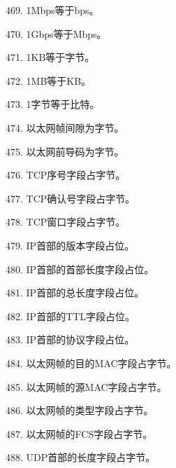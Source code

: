 469. 1Mbps等于\underline{\hspace{2cm}}bps。

470. 1Gbps等于\underline{\hspace{2cm}}Mbps。

471. 1KB等于\underline{\hspace{2cm}}字节。

472. 1MB等于\underline{\hspace{2cm}}KB。

473. 1字节等于\underline{\hspace{2cm}}比特。

474. 以太网帧间隙为\underline{\hspace{2cm}}字节。

475. 以太网前导码为\underline{\hspace{2cm}}字节。

476. TCP序号字段占\underline{\hspace{2cm}}字节。

477. TCP确认号字段占\underline{\hspace{2cm}}字节。

478. TCP窗口字段占\underline{\hspace{2cm}}字节。

479. IP首部的版本字段占\underline{\hspace{2cm}}位。

480. IP首部的首部长度字段占\underline{\hspace{2cm}}位。

481. IP首部的总长度字段占\underline{\hspace{2cm}}位。

482. IP首部的TTL字段占\underline{\hspace{2cm}}位。

483. IP首部的协议字段占\underline{\hspace{2cm}}位。

484. 以太网帧的目的MAC字段占\underline{\hspace{2cm}}字节。

485. 以太网帧的源MAC字段占\underline{\hspace{2cm}}字节。

486. 以太网帧的类型字段占\underline{\hspace{2cm}}字节。

487. 以太网帧的FCS字段占\underline{\hspace{2cm}}字节。

488. UDP首部的长度字段占\underline{\hspace{2cm}}字节。

